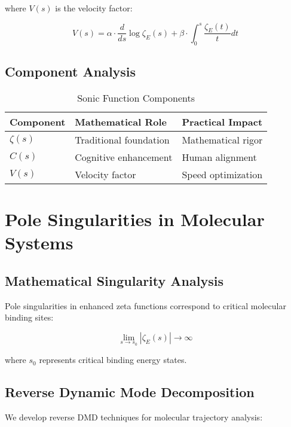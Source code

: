 \documentclass[12pt,a4paper]{article}
\begin{document}
where $V(s)$ is the velocity factor:

\begin{equation}
V(s) = \alpha \cdot \frac{d}{ds} \log \zeta_E(s) + \beta \cdot \int_0^s \frac{\zeta_E(t)}{t} dt
\label{eq:velocity_factor}
\end{equation}

\subsection{Component Analysis}

\begin{table}[H]
\centering
\caption{Sonic Function Components}
\begin{tabular}{@{}lll@{}}
\toprule
Component & Mathematical Role & Practical Impact \\
\midrule
$\zeta(s)$ & Traditional foundation & Mathematical rigor \\
$C(s)$ & Cognitive enhancement & Human alignment \\
$V(s)$ & Velocity factor & Speed optimization \\
\bottomrule
\end{tabular}
\label{tab:sonic_components}
\end{table}

\section{Pole Singularities in Molecular Systems}

\subsection{Mathematical Singularity Analysis}

Pole singularities in enhanced zeta functions correspond to critical molecular binding sites:

\begin{equation}
\lim_{s \to s_0} |\zeta_E(s)| \to \infty
\label{eq:pole_singularity}
\end{equation}

where $s_0$ represents critical binding energy states.

\subsection{Reverse Dynamic Mode Decomposition}

We develop reverse DMD techniques for molecular trajectory analysis:
\end{document}
